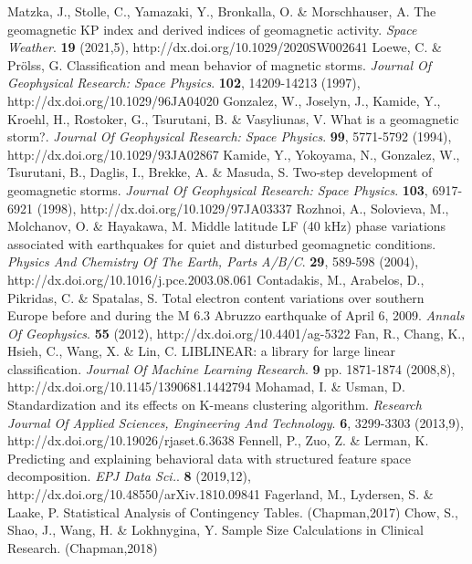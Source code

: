 \let\LaTeXcline\cline\documentclass[sn-mathphys-num]{sn-jnl}\let\cline\LaTeXcline
\begin{document}
\begin{thebibliography}{00}
Matzka, J., Stolle, C., Yamazaki, Y., Bronkalla, O. \& Morschhauser, A. The geomagnetic KP index and derived indices of geomagnetic activity. {\em Space Weather}. \textbf{19} (2021,5), http://dx.doi.org/10.1029/2020SW002641
Loewe, C. \& Prölss, G. Classification and mean behavior of magnetic storms. {\em Journal Of Geophysical Research: Space Physics}. \textbf{102}, 14209-14213 (1997), http://dx.doi.org/10.1029/96JA04020
Gonzalez, W., Joselyn, J., Kamide, Y., Kroehl, H., Rostoker, G., Tsurutani, B. \& Vasyliunas, V. What is a geomagnetic storm?. {\em Journal Of Geophysical Research: Space Physics}. \textbf{99}, 5771-5792 (1994), http://dx.doi.org/10.1029/93JA02867
Kamide, Y., Yokoyama, N., Gonzalez, W., Tsurutani, B., Daglis, I., Brekke, A. \& Masuda, S. Two-step development of geomagnetic storms. {\em Journal Of Geophysical Research: Space Physics}. \textbf{103}, 6917-6921 (1998), http://dx.doi.org/10.1029/97JA03337
Rozhnoi, A., Solovieva, M., Molchanov, O. \& Hayakawa, M. Middle latitude LF (40 kHz) phase variations associated with earthquakes for quiet and disturbed geomagnetic conditions. {\em Physics And Chemistry Of The Earth, Parts A/B/C}. \textbf{29}, 589-598 (2004), http://dx.doi.org/10.1016/j.pce.2003.08.061
Contadakis, M., Arabelos, D., Pikridas, C. \& Spatalas, S. Total electron content variations over southern Europe before and during the M 6.3 Abruzzo earthquake of April 6, 2009. {\em Annals Of Geophysics}. \textbf{55} (2012), http://dx.doi.org/10.4401/ag-5322
Fan, R., Chang, K., Hsieh, C., Wang, X. \& Lin, C. LIBLINEAR: a library for large linear classification. {\em Journal Of Machine Learning Research}. \textbf{9} pp. 1871-1874 (2008,8), http://dx.doi.org/10.1145/1390681.1442794
Mohamad, I. \& Usman, D. Standardization and its effects on K-means clustering algorithm. {\em Research Journal Of Applied Sciences, Engineering And Technology}. \textbf{6}, 3299-3303 (2013,9), http://dx.doi.org/10.19026/rjaset.6.3638
Fennell, P., Zuo, Z. \& Lerman, K. Predicting and explaining behavioral data with structured feature space decomposition. {\em EPJ Data Sci.}. \textbf{8} (2019,12), http://dx.doi.org/10.48550/arXiv.1810.09841
Fagerland, M., Lydersen, S. \& Laake, P. Statistical Analysis of Contingency Tables. (Chapman,2017)
Chow, S., Shao, J., Wang, H. \& Lokhnygina, Y. Sample Size Calculations in Clinical Research. (Chapman,2018)

\end{thebibliography}
\end{document}
